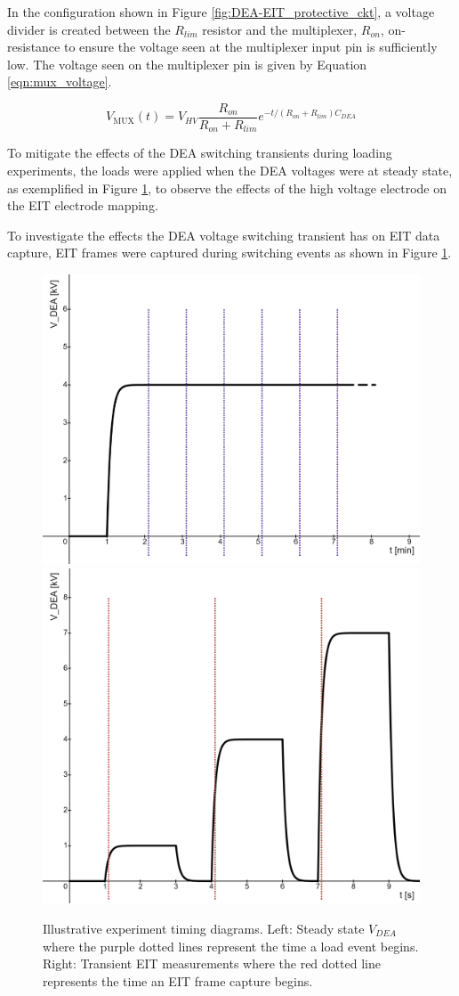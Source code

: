 In the configuration shown in Figure \ref{fig:DEA-EIT_protective_ckt}, a voltage divider is created between the $R_{lim}$ resistor and the multiplexer, $R_{on}$, on-resistance to ensure the voltage seen at the multiplexer input pin is sufficiently low. The voltage seen on the multiplexer pin is given by Equation \ref{eqn:mux_voltage}.

\begin{equation}
	V_{\mathrm{MUX}}(t) = V_{\mathit{HV}} \frac{R_{on}}{R_{on}+R_{lim}} e^{-t / (R_{on}+R_{lim})C_{\mathit{DEA}}}
	\label{eqn:mux_voltage}
\end{equation}

To mitigate the effects of the DEA switching transients during loading experiments, the loads were applied when the DEA voltages were at steady state, as exemplified in Figure \ref{fig:dea-eit_timing}, to observe the effects of the high voltage electrode on the EIT electrode mapping.

To investigate the effects the DEA voltage switching transient has on EIT data capture, EIT frames were captured during switching events as shown in Figure \ref{fig:dea-eit_timing}.

\begin{figure}[H]
	\centering
	\includegraphics[width=0.39\linewidth]{Figures/DEA-EIT_SS_loads_example.png}
	\hspace{1cm}
	\includegraphics[width=0.4\linewidth]{Figures/DEA-EIT_transient_VDEA_example.png}
	\vspace{0.3cm}
	\caption{Illustrative experiment timing diagrams. Left: Steady state $V_{DEA}$ where the purple dotted lines represent the time a load event begins. Right: Transient EIT measurements where the red dotted line represents the time an EIT frame capture begins.}
	\label{fig:dea-eit_timing}
\end{figure}



